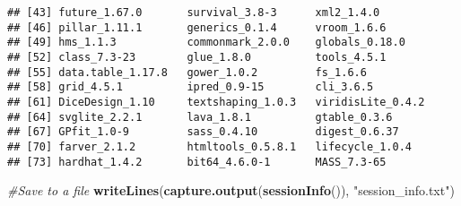 \documentclass[
]{article}
\newenvironment{Shaded}{\begin{snugshade}}{\end{snugshade}}
\newcommand{\CommentTok}[1]{\textcolor[rgb]{0.56,0.35,0.01}{\textit{#1}}}
\newcommand{\FunctionTok}[1]{\textcolor[rgb]{0.13,0.29,0.53}{\textbf{#1}}}
\newcommand{\NormalTok}[1]{#1}
\newcommand{\StringTok}[1]{\textcolor[rgb]{0.31,0.60,0.02}{#1}}
\begin{document}
\begin{verbatim}
## [43] future_1.67.0       survival_3.8-3      xml2_1.4.0         
## [46] pillar_1.11.1       generics_0.1.4      vroom_1.6.6        
## [49] hms_1.1.3           commonmark_2.0.0    globals_0.18.0     
## [52] class_7.3-23        glue_1.8.0          tools_4.5.1        
## [55] data.table_1.17.8   gower_1.0.2         fs_1.6.6           
## [58] grid_4.5.1          ipred_0.9-15        cli_3.6.5          
## [61] DiceDesign_1.10     textshaping_1.0.3   viridisLite_0.4.2  
## [64] svglite_2.2.1       lava_1.8.1          gtable_0.3.6       
## [67] GPfit_1.0-9         sass_0.4.10         digest_0.6.37      
## [70] farver_2.1.2        htmltools_0.5.8.1   lifecycle_1.0.4    
## [73] hardhat_1.4.2       bit64_4.6.0-1       MASS_7.3-65
\end{verbatim}

\begin{Shaded}
\begin{Highlighting}[]
\CommentTok{\#Save to a file}
\FunctionTok{writeLines}\NormalTok{(}\FunctionTok{capture.output}\NormalTok{(}\FunctionTok{sessionInfo}\NormalTok{()), }\StringTok{"session\_info.txt"}\NormalTok{)}
\end{Highlighting}
\end{Shaded}
\end{document}
